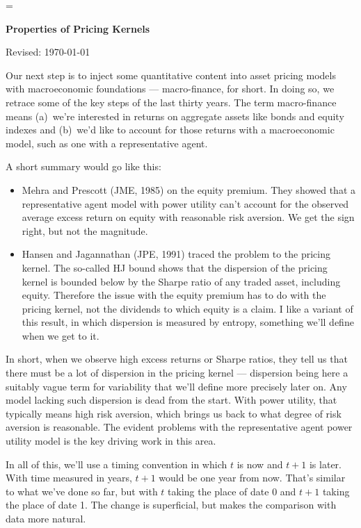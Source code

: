 \documentclass[11pt]{article}
\begin{document}
\parskip=\bigskipamount
\parindent=0.0in
\thispagestyle{empty}


\bigskip\bigskip
\centerline{\Large \bf Properties of Pricing Kernels}
\centerline{Revised: \today}

\bigskip
Our next step is to inject some quantitative content into asset
pricing models with macroeconomic foundations ---
macro-finance, for short.
In doing so, we retrace some of the key steps of the last thirty years.
The term macro-finance means
(a)~we're interested in returns on aggregate assets like bonds and equity indexes
and (b)~we'd like to account for those returns with a macroeconomic model,
such as one with a representative agent.

A short summary would go like this:
%
\begin{itemize}
\item Mehra and Prescott (JME, 1985) on the equity premium.
They showed that a representative agent model with power utility
can't account for the observed average excess return on equity
with reasonable risk aversion.
We get the sign right, but not the magnitude.
\item Hansen and Jagannathan (JPE, 1991) traced the problem to the pricing kernel.
The so-called HJ bound shows that the dispersion of the pricing kernel
is bounded below by the Sharpe ratio of any traded asset, including equity.
Therefore the issue with the equity premium has to do with the pricing kernel,
not the dividends to which equity is a claim.
I like a variant of this result, in which dispersion is measured
by entropy, something we'll define when we get to it.
\end{itemize}
%
In short, when we observe high excess returns or Sharpe ratios,
they tell us that there must be a lot of dispersion in the pricing kernel ---
dispersion being here a suitably vague term for variability that we'll define more precisely later on.
Any model lacking such dispersion is dead from the start.
With power utility, that typically means high risk aversion,
which brings us back to what degree of risk aversion is reasonable.
The evident problems with the representative agent power utility model
is the key driving work in this area.

In all of this, we'll use a timing convention in which $t$ is now
and $t+1$ is later.
With time measured in years, $t+1$ would be one year from now.
That's similar to what we've done so far,
but with $t$ taking the place of date 0 and $t+1$ taking the place of date 1.
The change is superficial, but makes the comparison with data
more natural.
\end{document}
